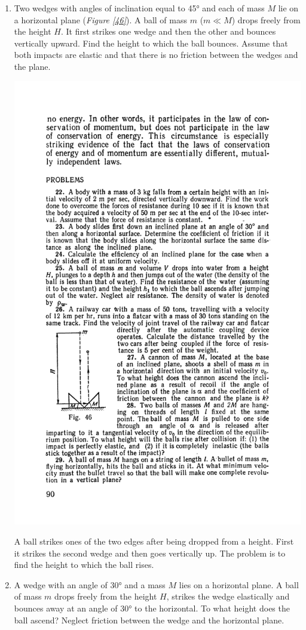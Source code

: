 \documentclass[a4paper,sfsidenotes]{tufte-book}
\begin{document}
\begin{enumerate}[resume*=problems]
\item Two wedges with angles of inclination equal to \ang{45} and each of mass $M$ lie on a horizontal plane (\emph{Figure \ref{46}}). A ball of mass $m$ ($m \ll M$) drops freely from the height $H$. It first strikes one wedge and then the other and bounces vertically upward. Find the height to which the ball bounces. Assume that both impacts are elastic and that there is no friction between the wedges and the plane.
\begin{marginfigure}
\centering
\includegraphics[width=0.8\linewidth]{fig-046a.pdf}
\caption{A ball strikes ones of the two edges after being dropped from a height. First it strikes the second wedge and then goes vertically up. The problem is to find the height to which the ball rises.}
\label{fig-46}
\end{marginfigure}

\item A wedge with an angle of \ang{30} and a mass $M$ lies on a horizontal plane. A ball of mass $m$ drops freely from the height $H$, strikes the wedge elastically and bounces away at an angle of \ang{30} to the horizontal. To what height does the ball ascend? Neglect friction between the wedge and the horizontal plane.\end{enumerate}
\end{document}
